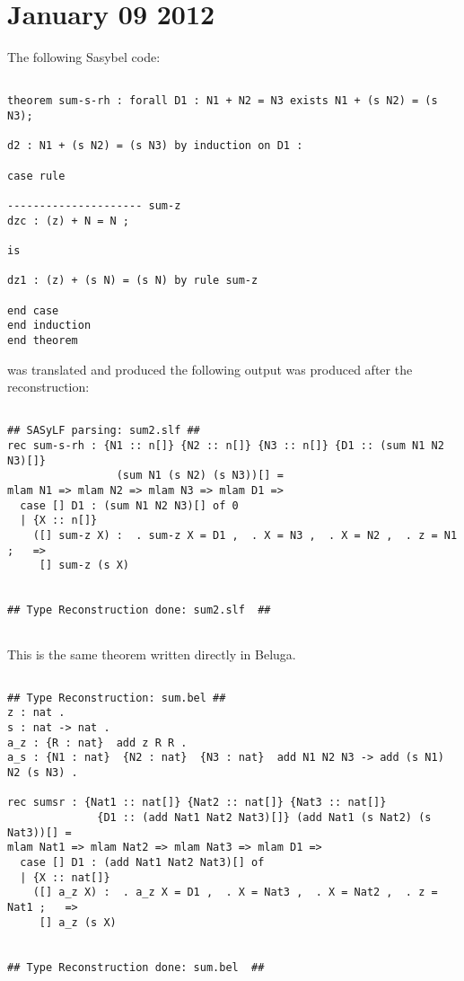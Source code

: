 \documentclass[12pt]{article}
\begin{document}
\section{January 09 2012}
The following \textmd{Sasybel} code:
\begin{verbatim}

theorem sum-s-rh : forall D1 : N1 + N2 = N3 exists N1 + (s N2) = (s N3);

d2 : N1 + (s N2) = (s N3) by induction on D1 :

case rule

--------------------- sum-z
dzc : (z) + N = N ;

is

dz1 : (z) + (s N) = (s N) by rule sum-z

end case
end induction
end theorem 

\end{verbatim}
was translated and produced the following output was produced after the reconstruction:
\begin{verbatim}

## SASyLF parsing: sum2.slf ##
rec sum-s-rh : {N1 :: n[]} {N2 :: n[]} {N3 :: n[]} {D1 :: (sum N1 N2 N3)[]}
                 (sum N1 (s N2) (s N3))[] = 
mlam N1 => mlam N2 => mlam N3 => mlam D1 => 
  case [] D1 : (sum N1 N2 N3)[] of 0
  | {X :: n[]}
    ([] sum-z X) :  . sum-z X = D1 ,  . X = N3 ,  . X = N2 ,  . z = N1 ;   => 
     [] sum-z (s X)
  

## Type Reconstruction done: sum2.slf  ##


\end{verbatim}
This is the same theorem written directly in \textmd{Beluga}.
\begin{verbatim}

## Type Reconstruction: sum.bel ##
z : nat .
s : nat -> nat .
a_z : {R : nat}  add z R R .
a_s : {N1 : nat}  {N2 : nat}  {N3 : nat}  add N1 N2 N3 -> add (s N1) N2 (s N3) .

rec sumsr : {Nat1 :: nat[]} {Nat2 :: nat[]} {Nat3 :: nat[]}
              {D1 :: (add Nat1 Nat2 Nat3)[]} (add Nat1 (s Nat2) (s Nat3))[] = 
mlam Nat1 => mlam Nat2 => mlam Nat3 => mlam D1 => 
  case [] D1 : (add Nat1 Nat2 Nat3)[] of 
  | {X :: nat[]}
    ([] a_z X) :  . a_z X = D1 ,  . X = Nat3 ,  . X = Nat2 ,  . z = Nat1 ;   => 
     [] a_z (s X)
  

## Type Reconstruction done: sum.bel  ##

\end{verbatim}
\end{document}
